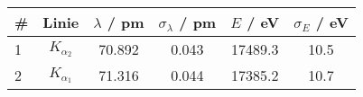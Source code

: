 \begin{tabular}{lcSSSS}
\toprule
\# & Linie & {$\lambda$ / \si{\pico\metre}} & {$\sigma_{\lambda}$ / \si{\pico\metre}} & {$E$ / \si{\electronvolt}} & {$\sigma_E$ / \si{\electronvolt}} \\
	& $K_{\alpha_2}$	& 70.892	& 0.043	& 17489.3	& 10.5 \\
2	& $K_{\alpha_1}$	& 71.316	& 0.044	& 17385.2	& 10.7 \\
\bottomrule
\end{tabular}